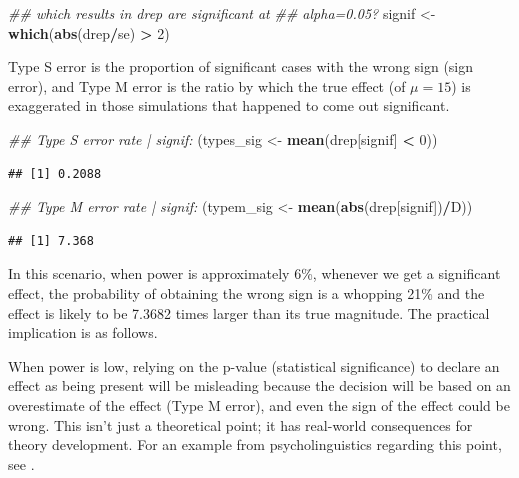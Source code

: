 \documentclass[12pt,]{krantz}
\newenvironment{Shaded}{\begin{snugshade}}{\end{snugshade}}
\newcommand{\CommentTok}[1]{\textcolor[rgb]{0.56,0.35,0.01}{\textit{#1}}}
\newcommand{\DecValTok}[1]{\textcolor[rgb]{0.00,0.00,0.81}{#1}}
\newcommand{\KeywordTok}[1]{\textcolor[rgb]{0.13,0.29,0.53}{\textbf{#1}}}
\newcommand{\NormalTok}[1]{#1}
\newcommand{\OperatorTok}[1]{\textcolor[rgb]{0.81,0.36,0.00}{\textbf{#1}}}
\newcommand{\StringTok}[1]{\textcolor[rgb]{0.31,0.60,0.02}{#1}}
\begin{document}
\begin{Shaded}
\begin{Highlighting}[]
\CommentTok{## which results in drep are significant at}
\CommentTok{## alpha=0.05?}
\NormalTok{signif <-}\StringTok{ }\KeywordTok{which}\NormalTok{(}\KeywordTok{abs}\NormalTok{(drep}\OperatorTok{/}\NormalTok{se) }\OperatorTok{>}\StringTok{ }\DecValTok{2}\NormalTok{)}
\end{Highlighting}
\end{Shaded}

Type S error is the proportion of significant cases with the wrong sign (sign error), and Type M error is the ratio by which the true effect (of \(\mu=15\)) is exaggerated in those simulations that happened to come out significant.

\begin{Shaded}
\begin{Highlighting}[]
\CommentTok{## Type S error rate | signif:}
\NormalTok{(types_sig <-}\StringTok{ }\KeywordTok{mean}\NormalTok{(drep[signif] }\OperatorTok{<}\StringTok{ }\DecValTok{0}\NormalTok{))}
\end{Highlighting}
\end{Shaded}

\begin{verbatim}
## [1] 0.2088
\end{verbatim}

\begin{Shaded}
\begin{Highlighting}[]
\CommentTok{## Type M error rate | signif:}
\NormalTok{(typem_sig <-}\StringTok{ }\KeywordTok{mean}\NormalTok{(}\KeywordTok{abs}\NormalTok{(drep[signif])}\OperatorTok{/}\NormalTok{D))}
\end{Highlighting}
\end{Shaded}

\begin{verbatim}
## [1] 7.368
\end{verbatim}

In this scenario, when power is approximately 6\%, whenever we get a significant effect, the probability of obtaining the wrong sign is a whopping 21\% and the effect is likely to be 7.3682 times larger than its true magnitude. The practical implication is as follows.

When power is low, relying on the p-value (statistical significance) to declare an effect as being present will be misleading because the decision will be based on an overestimate of the effect (Type M error), and even the sign of the effect could be wrong. This isn't just a theoretical point; it has real-world consequences for theory development. For an example from psycholinguistics regarding this point, see \citet{VasishthMertzenJaegerGelman2018}.
\end{document}
